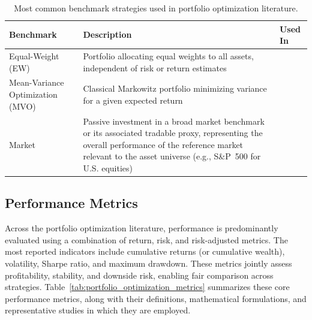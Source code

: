 \begin{table}[ht]
\centering
\caption{Most common benchmark strategies used in portfolio optimization literature.}
\label{tab:benchmark_strategies}
\begin{tabular}{|p{3cm} | p{9.3cm} | p{2cm}|}
\hline
\textbf{Benchmark} & \textbf{Description} & \textbf{Used In} \\
\hline

Equal-Weight (EW)
& Portfolio allocating equal weights to all assets, independent of risk or return estimates
& \cite{e6ca3, 83780, 4e332} \\
\hline
Mean-Variance Optimization (MVO)
& Classical Markowitz portfolio minimizing variance for a given expected return
& \cite{0df79, e6ca3} \\
\hline
Market
& Passive investment in a broad market benchmark or its associated tradable proxy, representing the overall performance of the reference market relevant to the asset universe (e.g., S\&P~500 for U.S. equities)
& \cite{de270, 4e332, 4061c, 83780, 34309} \\

\hline
\end{tabular}
\end{table}

\subsection{Performance Metrics}

Across the portfolio optimization literature, performance is predominantly evaluated using a combination of return, risk, and risk-adjusted metrics. The most reported indicators include cumulative returns (or cumulative wealth), volatility, Sharpe ratio, and maximum drawdown. These metrics jointly assess profitability, stability, and downside risk, enabling fair comparison across strategies. Table~\ref{tab:portfolio_optimization_metrics} summarizes these core performance metrics, along with their definitions, mathematical formulations, and representative studies in which they are employed.

